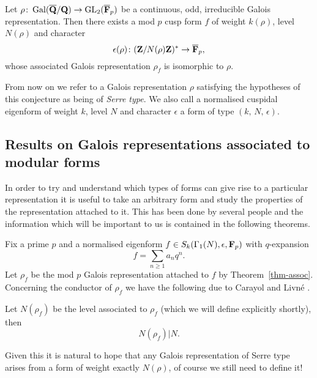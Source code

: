 \documentclass[a4paper,12pt]{article}
\begin{document}
\begin{conjecture}\label{conj-ref}
Let $\rho\colon \operatorname{Gal}(\overline{\mathbf{Q}}/\mathbf{Q}) \to \operatorname{GL}_2(\overline{\mathbf{F}}_p)$ be a continuous, odd, irreducible Galois representation.
Then there exists a mod $p$ cusp form $f$ of weight $k(\rho)$, level $N(\rho)$ and character
\[
\epsilon(\rho)\colon (\mathbf{Z}/N(\rho)\mathbf{Z})^* \to \overline{\mathbf{F}}_p,
\]
whose associated Galois representation $\rho_f$ is isomorphic to $\rho$.
\end{conjecture}


From now on we refer to a Galois representation $\rho$ satisfying the hypotheses of this conjecture as being of \emph{Serre type}.
We also call a normalised cuspidal eigenform of weight $k$, level $N$ and character $\epsilon$ a form of type $(k,\,N,\,\epsilon)$.%

\subsection{Results on Galois representations associated to modular forms}
In order to try and understand which types of forms can give rise to a particular representation it is useful to take an arbitrary form and study the properties of the representation attached to it.
This has been done by several people and the information which will be important to us is contained in the following theorems. %

Fix a prime $p$ and a normalised eigenform $f \in S_k(\Gamma_1(N), \epsilon, \mathbf{F}_p)$ with $q$-expansion %
\[
f = \sum_{n\ge 1} a_nq^n.
\]
Let $\rho_f$ be the mod $p$ Galois representation attached to $f$ by Theorem~\ref{thm-assoc}.
Concerning the conductor of $\rho_f$ we have the following due to Carayol and Livn\'e \cite{Carayol, Livne}.

\begin{thm}
Let $N(\rho_f)$ be the level associated to $\rho_f$ (which we will define explicitly shortly), then
\[
N(\rho_f)|N.
\]
\end{thm}

Given this it is natural to hope that any Galois representation of Serre type arises from a form of weight exactly $N(\rho)$, of course we still need to define it!
\end{document}
